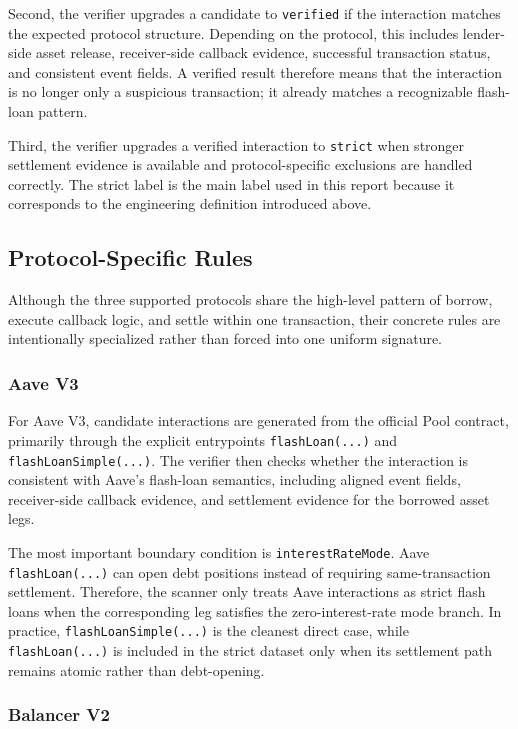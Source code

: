Second, the verifier upgrades a candidate to \texttt{verified} if the interaction matches the expected protocol structure. Depending on the protocol, this includes lender-side asset release, receiver-side callback evidence, successful transaction status, and consistent event fields. A verified result therefore means that the interaction is no longer only a suspicious transaction; it already matches a recognizable flash-loan pattern.

Third, the verifier upgrades a verified interaction to \texttt{strict} when stronger settlement evidence is available and protocol-specific exclusions are handled correctly. The strict label is the main label used in this report because it corresponds to the engineering definition introduced above.

\subsection{Protocol-Specific Rules}

Although the three supported protocols share the high-level pattern of borrow, execute callback logic, and settle within one transaction, their concrete rules are intentionally specialized rather than forced into one uniform signature.

\subsubsection{Aave V3}

For Aave V3, candidate interactions are generated from the official Pool contract, primarily through the explicit entrypoints \texttt{flashLoan(...)} and \texttt{flashLoanSimple(...)}. The verifier then checks whether the interaction is consistent with Aave's flash-loan semantics, including aligned event fields, receiver-side callback evidence, and settlement evidence for the borrowed asset legs.

The most important boundary condition is \texttt{interestRateMode}. Aave \texttt{flashLoan(...)} can open debt positions instead of requiring same-transaction settlement. Therefore, the scanner only treats Aave interactions as strict flash loans when the corresponding leg satisfies the zero-interest-rate mode branch. In practice, \texttt{flashLoanSimple(...)} is the cleanest direct case, while \texttt{flashLoan(...)} is included in the strict dataset only when its settlement path remains atomic rather than debt-opening.

\subsubsection{Balancer V2}

